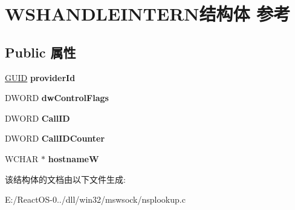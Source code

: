 \hypertarget{struct_w_s_h_a_n_d_l_e_i_n_t_e_r_n}{}\section{W\+S\+H\+A\+N\+D\+L\+E\+I\+N\+T\+E\+R\+N结构体 参考}
\label{struct_w_s_h_a_n_d_l_e_i_n_t_e_r_n}
\subsection*{Public 属性}
\begin{DoxyCompactItemize}
\item 
\mbox{\label{struct_w_s_h_a_n_d_l_e_i_n_t_e_r_n_ae4e9aa8b274f862508948d7369f734c0}} 
\hyperlink{interface_g_u_i_d}{G\+U\+ID} {\bfseries provider\+Id}
\item 
\mbox{\label{struct_w_s_h_a_n_d_l_e_i_n_t_e_r_n_ab561c0095c8786ac3fd0c522265792a9}} 
D\+W\+O\+RD {\bfseries dw\+Control\+Flags}
\item 
\mbox{\label{struct_w_s_h_a_n_d_l_e_i_n_t_e_r_n_adf3e506b0a33066752acae6b21e358ae}} 
D\+W\+O\+RD {\bfseries Call\+ID}
\item 
\mbox{\label{struct_w_s_h_a_n_d_l_e_i_n_t_e_r_n_a6a5e3d4b9ad5ceda6dcf1b80e062db12}} 
D\+W\+O\+RD {\bfseries Call\+I\+D\+Counter}
\item 
\mbox{\label{struct_w_s_h_a_n_d_l_e_i_n_t_e_r_n_ab0be23eb889cbe4ab1cc440ad0426d59}} 
W\+C\+H\+AR $\ast$ {\bfseries hostnameW}
\end{DoxyCompactItemize}


该结构体的文档由以下文件生成\+:\begin{DoxyCompactItemize}
\item 
E\+:/\+React\+O\+S-\/0../dll/win32/mswsock/nsplookup.\+c\end{DoxyCompactItemize}
